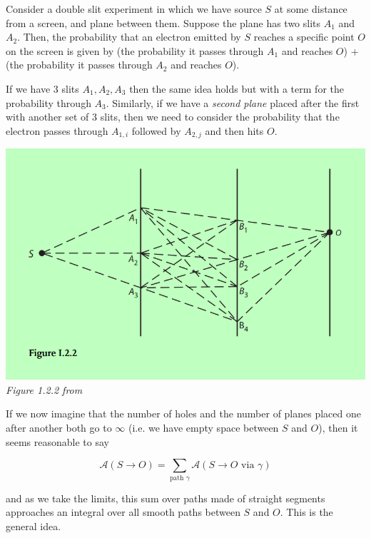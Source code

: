 \documentclass[11pt]{article}
\begin{document}
Consider a double slit experiment in which we have source $S$ at some distance from a screen, and plane between them. Suppose the plane has two slits $A_1$ and $A_2$. Then, the probability that an electron emitted by $S$ reaches a specific point $O$ on the screen is given by (the probability it passes through $A_1$ and reaches $O$) + (the probability it passes through $A_2$ and reaches $O$). 

\vskip 0.5cm
If we have 3 slits $A_1, A_2, A_3$ then the same idea holds but with a term for the probability through $A_3$. Similarly, if we have a \textit{second plane} placed after the first with another set of 3 slits, then we need to consider the probability that the electron passes through $A_{1,i}$ followed by $A_{2,j}$ and then hits $O$.

\vskip 0.5cm
\begin{center}
    \includegraphics[scale=0.5]{multiple_slits.png} \\
    \textit{Figure 1.2.2 from} \cite[Zee, QFT in a Nutshell]{ZeeQFTNutshell}
\end{center}

\vskip 0.5cm
If we now imagine that the number of holes and the number of planes placed one after another both go to $\infty$ (i.e. we have empty space between $S$ and $O$), then it seems reasonable to say 

\[ \mathcal{A}(S \rightarrow O) =  \sum_{\text{path } \gamma} \mathcal{A}\left(S \rightarrow O \text{ via } \gamma\right) \]

and as we take the limits, this sum over paths made of straight segments approaches an integral over all smooth paths between $S$ and $O$. This is the general idea.


\vskip 0.5cm
\end{document}
